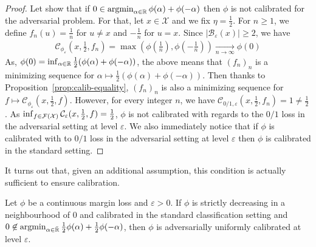 \begin{proof}

    Let show that if $0\in\operatorname*{argmin}_{\alpha\in\mathbb{R}} \phi(\alpha)+\phi(-\alpha)$ then $\phi$ is not calibrated for the adversarial problem. For that, let $x\in\mathcal{X}$ and we fix $\eta = \frac12$.  For $n\geq1$, we define $f_n(u) = \frac1n$ for $u\neq x$ and $-\frac{1}{n}$ for $u=x$.  Since $\lvert\mathcal{B}_\varepsilon(x)\rvert\geq 2$, we have
    \begin{align*}
         \mathcal{C}_{\phi_\varepsilon}(x,\frac12,f_n) = \max\left(\phi(\frac1n),\phi(-\frac1n)\right)\xrightarrow[n\to\infty]{} \phi(0) %
    \end{align*}
    As, $\phi(0) = \inf_{\alpha\in\RR}\frac12\left(\phi(\alpha)+\phi(-\alpha)\right)$, the above means that $(f_n)_n$ is a minimizing sequence for $\alpha \mapsto \frac12 \left(\phi(\alpha)+\phi(-\alpha)\right)$. 
    Then thanks to Proposition~\ref{prop:calib-equality}, $(f_n)_n$ is also a minimizing sequence for $f \mapsto\mathcal{C}_{\phi_\varepsilon}(x,\frac12,f)$. However, for every integer $n$, we have $\mathcal{C}_{0/1,\varepsilon}(x,\frac12,f_n) =1\neq\frac12$. As  $\inf_{f\in\mathcal{F}(\mathcal{X})}\mathcal{C}_{\varepsilon}(x,\frac12,f)=\frac12$, $\phi$ is not calibrated with regards to the $0/1$ loss in the adversarial setting at level $\varepsilon$. We also immediately notice that if $\phi$ is  calibrated with to  $0/1$ loss in the adversarial setting at level $\varepsilon$ then $\phi$ is calibrated in the standard setting. 
    
    
\end{proof}



It turns out that, given an additional assumption, this condition is actually sufficient to ensure calibration.


\begin{thm} 
\label{thm:calibration}
Let $\phi$  be a continuous margin loss and $\varepsilon>0$. If $\phi$ is strictly decreasing in a neighbourhood of $0$ and calibrated in the standard classification setting and $0\not\in \operatorname*{argmin}_{\alpha\in\bar{\mathbb{R}}}
\frac12\phi(\alpha)+\frac12\phi(-\alpha)$, then $\phi$ is adversarially uniformly calibrated at level $\varepsilon$.
\end{thm}


